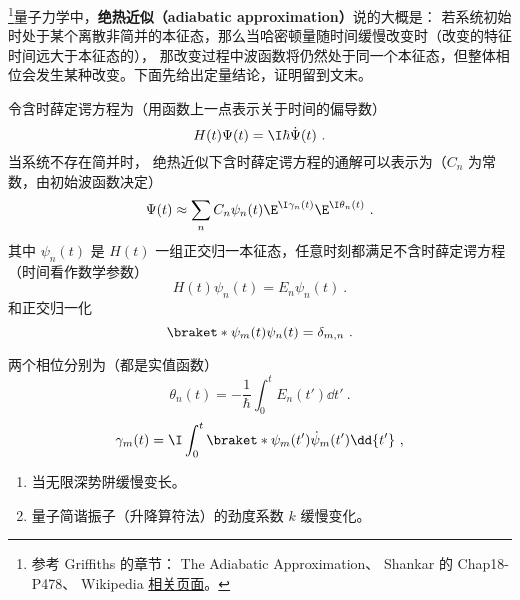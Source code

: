 
\begin{issues}
\issueTODO
\end{issues}


\footnote{参考 Griffiths\cite{GriffE} 的章节： The Adiabatic Approximation、 Shankar\cite{Shankar} 的 Chap18-P478、 Wikipedia \href{https://en.wikipedia.org/wiki/Adiabatic_theorem}{相关页面}。}量子力学中，\textbf{绝热近似（adiabatic approximation）}说的大概是： 若系统初始时处于某个离散非简并的本征态，那么当哈密顿量随时间缓慢改变时（改变的特征时间远大于本征态的）， 那改变过程中波函数将仍然处于同一个本征态，但整体相位会发生某种改变。下面先给出定量结论，证明留到文末。

令含时薛定谔方程为（用函数上一点表示关于时间的偏导数）
\begin{equation}
H(t)\Psi(t) = \I\hbar\dot\Psi(t)~.
\end{equation}
当系统不存在简并时， 绝热近似下含时薛定谔方程的通解可以表示为（$C_n$ 为常数，由初始波函数决定）
\begin{equation}\label{eq_AdiaQM_2}
\Psi(t) \approx \sum_n C_n \psi_n(t) \E^{\I\gamma_n(t)}\E^{\I\theta_n(t)}~.
\end{equation}
其中 $\psi_n(t)$ 是 $H(t)$ 一组正交归一本征态，任意时刻都满足不含时薛定谔方程（时间看作数学参数）
\begin{equation}\label{eq_AdiaQM_3}
H(t)\psi_n(t) = E_n\psi_n(t)~.
\end{equation}
和正交归一化
\begin{equation}\label{eq_AdiaQM_6}
\braket*{\psi_m(t)}{\psi_n(t)} = \delta_{m,n}~.
\end{equation}

两个相位分别为（都是实值函数）
\begin{equation}
\theta_n(t) = -\frac{1}{\hbar} \int_0^t E_n(t')\dd{t'}~.
\end{equation}
\begin{equation}
\gamma_m(t) = \I\int_0^t \braket*{\psi_m(t')}{\dot\psi_m(t')}\dd{t'}~,
\end{equation}

\begin{example}{}
\begin{enumerate}
\item 当无限深势阱缓慢变长。
\item 量子简谐振子（升降算符法）的劲度系数 $k$ 缓慢变化。
\end{enumerate}
\end{example}

